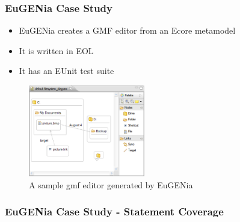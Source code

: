 \begin{frame}
\frametitle{EuGENia Case Study}

\begin{itemize}
\item EuGENia creates a GMF editor from an Ecore metamodel
\item It is written in EOL
\item It has an EUnit test suite
\end{itemize}

\begin{figure}
	\includegraphics[width=2in]{figures/gmfeditor.png}
\caption{A sample gmf editor generated by EuGENia}
\end{figure}

\end{frame}

\begin{frame}
\frametitle{EuGENia Case Study - Statement Coverage}


\end{frame}